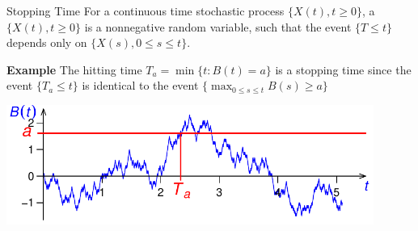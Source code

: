 \documentclass[letterpaper]{beamer}
\begin{document}
\begin{frame}{Stopping Time}
For a continuous time stochastic process $\{X(t),t\ge 0\}$,
a  $\{X(t),t\ge 0\}$ is a nonnegative random variable, such that
the event $\{T\le t\}$ depends only on $\{X(s),0\le s\le t\}.$\bigskip

\begin{block}{\bf Example}
The hitting time $T_a=\min\{t: B(t)=a\}$ is a stopping time since
the event $\{T_a\le t\}$ is identical to the event $\Big\{\displaystyle\max_{0\le s\le t}B(s)\ge a\Big\}$
\end{block}
\begin{center}
\includegraphics[width=0.9\textwidth]{Lecture22_hitting_time.pdf}
\end{center}

\end{frame}
\end{document}

